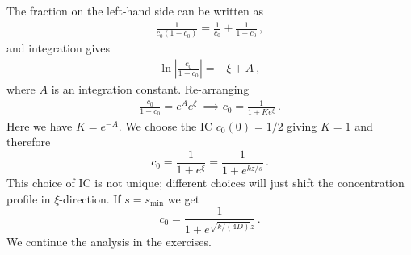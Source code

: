 The fraction on the left-hand side can be written as
\begin{eqnarray}
	\frac{1}{c_0(1-c_0)} = \frac{1}{c_0} + \frac{1}{1-c_0} \, ,
\end{eqnarray}
and integration gives
\begin{eqnarray}
	\ln \left| \frac{c_0}{1-c_0}\right| = -\xi + A \ , 
\end{eqnarray}
where $A$ is an integration constant. Re-arranging
\begin{eqnarray}
	\frac{c_0}{1-c_0} = e^A e^\xi \ \implies c_0 = \frac{1}{1+Ke^{\xi}} \, .
\end{eqnarray}
Here we have $K=e^{-A}$. We choose the IC $c_0(0)=1/2$ giving $K=1$ and therefore
\begin{equation}
c_0 = \frac{1}{1+e^{\xi}} = \frac{1}{1+e^{kz/s}} \, .
\end{equation}
This choice of IC is not unique; different choices will just shift the 
concentration profile in $\xi$-direction. If $s=s_\text{min}$ we get
\begin{equation}
\label{eq:u0fk} 
c_0 = \frac{1}{1+e^{\sqrt{k/(4D)}z}} \, .
\end{equation}
We continue the analysis in the exercises.

